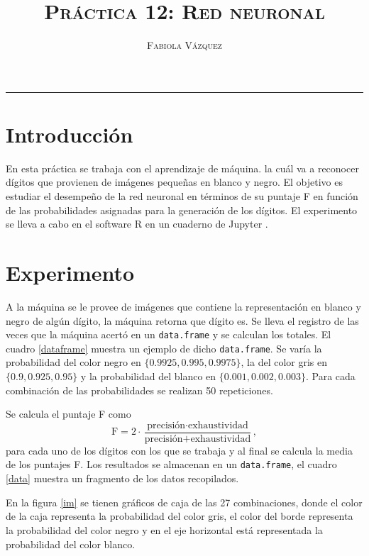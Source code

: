 \documentclass[12pt,letterpaper]{article}
\title{\textsc{Práctica 12: Red neuronal}}
\author{\textsc{Fabiola Vázquez}}
\begin{document}
\maketitle

\hrule
\section{Introducción}
En esta práctica \cite{elisapractica12} se trabaja con el aprendizaje de máquina.  la cuál va a reconocer dígitos que provienen de imágenes pequeñas en blanco y negro. El objetivo es estudiar el desempeño de la red neuronal en términos de su puntaje F en función de las probabilidades asignadas para la generación de los dígitos. El experimento se lleva a cabo en el software R \cite{R} en un cuaderno de Jupyter \cite{jupyter}.

\section{Experimento}
A la máquina se le provee de imágenes que contiene la representación en blanco y negro de algún dígito, la máquina retorna que dígito es. Se lleva el registro de las veces que la máquina acertó en un \texttt{data.frame} y se calculan los totales. El cuadro \ref{dataframe} muestra un ejemplo de dicho \texttt{data.frame}.
Se varía la probabilidad del color negro en $\{0.9925, 0.995, 0.9975\}$, la del color gris en $\{0.9, 0.925, 0.95\}$ y la probabilidad del blanco en $\{0.001, 0.002, 0.003\}$. Para cada combinación de las probabilidades se realizan 50 repeticiones.

Se calcula el puntaje F \cite{F} como
\begin{equation}
\text{F} = 2 \cdot \frac{\text{precisión}\cdot \text{exhaustividad}}{\text{precisión} + \text{exhaustividad}},
\end{equation}
para cada uno de los dígitos con los que se trabaja y al final se calcula la media de los puntajes F. Los resultados se almacenan en un \texttt{data.frame}, el cuadro \ref{data} muestra un fragmento de los datos recopilados.

En la figura \ref{im} se tienen gráficos de caja de las 27 combinaciones, donde el color de la caja representa la probabilidad del color gris, el color del borde representa la probabilidad del color negro y en el eje horizontal está representada la probabilidad del color blanco. 
\end{document}
